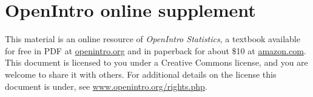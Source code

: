 \documentclass[10pt,openany,oneside]{book}
\date{}
\begin{document}
\section*{OpenIntro online supplement}

This material is an online resource of \emph{OpenIntro Statistics}, a textbook available for free in PDF at \href{http://www.openintro.org}{openintro.org} and in paperback for about \$10 at \href{http://openintro.org/redirect.php?go=amazon_os3&referrer=pdf_of_an_online_extra}{amazon.com}. This document is licensed to you under a Creative Commons license, and you are welcome to share it with others. For additional details on the license this document is under, see \href{http://www.openintro.org/rights.php}{www.openintro.org/rights.php}.

%

%
\end{document}
